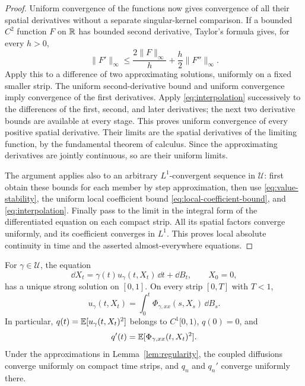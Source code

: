 \begin{proof}
Uniform convergence of the functions now gives convergence of all
their spatial derivatives without a separate singular-kernel
comparison.  If a bounded $C^2$ function $F$ on $\mathbb R$ has bounded
second derivative, Taylor's formula gives, for every $h>0$,
\begin{equation}
 \|F'\|_\infty\leq
 \frac{2\|F\|_\infty}{h}
       +\frac h2\|F''\|_\infty.
 \label{eq:interpolation}
\end{equation}
Apply this to a difference of two approximating solutions, uniformly
on a fixed smaller strip.  The uniform second-derivative bound and
uniform convergence imply convergence of the first derivatives.
Apply \eqref{eq:interpolation} successively to the differences of
the first, second, and later derivatives; the next two derivative
bounds are available at every stage.  This proves uniform convergence
of every positive spatial derivative.  Their limits are the spatial
derivatives of the limiting function, by the fundamental theorem of
calculus.  Since the approximating derivatives are jointly continuous,
so are their uniform limits.

The argument applies also to an arbitrary $L^1$-convergent sequence in
$\mathcal U$: first obtain these bounds for each member by step
approximation, then use \eqref{eq:value-stability}, the uniform local
coefficient bound \eqref{eq:local-coefficient-bound}, and
\eqref{eq:interpolation}.  Finally pass to the limit in the integral
form of the differentiated equation on each compact strip.
All its spatial factors converge uniformly, and its coefficient
converges in $L^1$.  This proves local absolute continuity in time and
the asserted almost-everywhere equations.
\end{proof}

\begin{lemma}
\label{lem:diffusion}
For $\gamma\in\mathcal U$, the equation
\begin{equation}
 \dd X_t=\gamma(t)u_\gamma(t,X_t)\,\dd t+\dd B_t,
 \qquad X_0=0,
 \label{eq:controlled-diffusion}
\end{equation}
has a unique strong solution on $[0,1]$.  On every strip $[0,T]$ with $T<1$,
\begin{equation}
 u_\gamma(t,X_t)=\int_0^t
                \Phi_{\gamma,xx}(s,X_s)\,\dd B_s.
 \label{eq:gradient-martingale}
\end{equation}
In particular, $q(t)=\mathbb E[u_\gamma(t,X_t)^2]$ belongs to $C^1[0,1)$,
$q(0)=0$, and
\begin{equation}
 q'(t)=\mathbb E[\Phi_{\gamma,xx}(t,X_t)^2].
 \label{eq:qprime}
\end{equation}
Under the approximations in Lemma~\ref{lem:regularity}, the coupled
diffusions converge uniformly on compact time strips, and $q_n$ and
$q_n'$ converge uniformly there.
\end{lemma}


